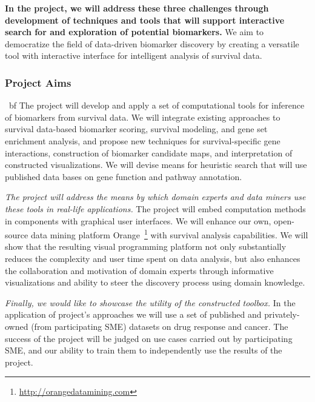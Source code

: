 \documentclass[11pt,a4paper]{article}
\renewcommand{\bold}{\textbf}
\begin{document}
\bold{In the project, we will address these three challenges through development of techniques and tools that will support interactive search for and exploration of potential biomarkers.} We aim to democratize the field of data-driven biomarker discovery by creating a versatile tool with interactive interface for intelligent analysis of survival data.

\subsubsection*{Project Aims}

{\ bf The project will develop and apply a set of computational tools for inference of biomarkers from survival data.} We will integrate existing approaches to survival data-based biomarker scoring, survival modeling, and gene set enrichment analysis, and propose new techniques for survival-specific gene interactions, construction of biomarker candidate maps, and interpretation of constructed visualizations. We will devise means for heuristic search that will use published data bases on gene function and pathway annotation.

{\em The project will address the means by which domain experts and data miners use these tools in real-life applications.} The project will embed computation methods in components with graphical user interfaces. We will enhance our own, open-source data mining platform Orange~\footnote{\url{http://orangedatamining.com}} with survival analysis capabilities. We will show that the resulting visual programming platform not only substantially reduces the complexity and user time spent on data analysis, but also enhances the collaboration and motivation of domain experts through informative visualizations and ability to steer the discovery process using domain knowledge. 

{\em Finally, we would like to showcase the utility of the constructed toolbox.} In the application of project's approaches we will use a set of published and privately-owned (from participating SME) datasets on drug response and cancer. The success of the project will be judged on use cases carried out by participating SME, and our ability to train them to independently use the results of the project.
\end{document}
